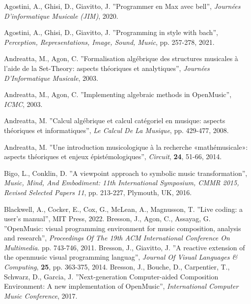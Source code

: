 \documentclass{article}
\begin{document}
\newpage

% 
%

\begin{thebibliography}{2}
  Agostini, A., Ghisi, D., Giavitto, J. ''Programmer en Max avec bell'', 
  {\em Journées D'informatique Musicale (JIM)}, 2020.

   Agostini, A., Ghisi, D., Giavitto, J. ''Programming in style with bach'',
   {\em Perception, Representations, Image, Sound, Music}, pp. 257-278, 2021.

  Andreatta, M., Agon, C. ''Formalisation algébrique des structures musicales à l'aide de la Set-Theory: aspects théoriques et analytiques'',
  {\em Journées D'Informatique Musicale}, 2003.

  Andreatta, M., Agon, C.
  ''Implementing algebraic methods in OpenMusic'', 
  {\em ICMC}, 2003.

  Andreatta, M. 
  ''Calcul algébrique et calcul catégoriel en musique: aspects théoriques et informatiques'',
  {\em Le Calcul De La Musique}, pp. 429-477, 2008.

  Andreatta, M. 
  ''Une introduction musicologique à la recherche «mathémusicale»: aspects théoriques et enjeux épistémologiques'',
  {\em Circuit}, \textbf{24}, 51-66, 2014.

  Bigo, L., Conklin, D. 
  ''A viewpoint approach to symbolic music transformation'',
  {\em Music, Mind, And Embodiment: 11th International Symposium, CMMR 2015, Revised Selected Papers 11}, pp. 213-227, Plymouth, UK, 2016.

  Blackwell, A., Cocker, E., Cox, G., McLean, A., Magnusson, T.
  ''Live coding: a user's manual'',
  MIT Press, 2022.
  Bresson, J., Agon, C., Assayag, G. 
  ''OpenMusic: visual programming environment for music composition, analysis and research'',
  {\em Proceedings Of The 19th ACM International Conference On Multimedia}. pp. 743-746, 2011.
  Bresson, J., Giavitto, J. 
  ''A reactive extension of the openmusic visual programming languag'',
  {\em Journal Of Visual Languages \& Computing}, \textbf{25}, pp. 363-375, 2014.
  Bresson, J., Bouche, D., Carpentier, T., Schwarz, D., Garcia, J. 
  ''Next-generation Computer-aided Composition Environment: A new implementation of OpenMusic'',
   {\em International Computer Music Conference}, 2017.


\end{thebibliography}
\end{document}
